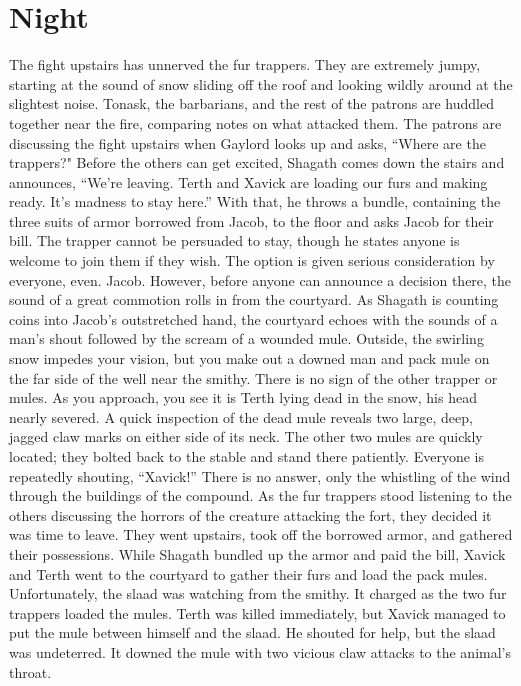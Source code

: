 \documentclass[a5paper,11pt,twoside]{book}
\begin{document}
{{{{\section*{Night} The fight upstairs has unnerved the fur trappers.
They are extremely jumpy, starting at the sound of snow sliding off the roof and looking wildly around at the slightest noise.
Tonask, the barbarians, and the rest of the patrons are huddled together near the fire, comparing notes on what attacked them.
The patrons are discussing the fight upstairs when Gaylord looks up and asks, “Where are the trappers?" Before the others can get excited, Shagath comes down the stairs and announces, “We’re leaving.
Terth and Xavick are loading our furs and making ready.
It’s madness to stay here.” With that, he throws a bundle, containing the three suits of armor borrowed from Jacob, to the floor and asks Jacob for their bill.
The trapper cannot be persuaded to stay, though he states anyone is welcome to join them if they wish.
The option is given serious consideration by everyone, even.
Jacob.
However, before anyone can announce a decision there, the sound of a great commotion rolls in from the courtyard.
 As Shagath is counting coins into Jacob’s outstretched hand, the courtyard echoes with the sounds of a man’s shout followed by the scream of a wounded mule.
Outside, the swirling snow impedes your vision, but you make out a downed man and pack mule on the far side of the well near the smithy.
There is no sign of the other trapper or mules.
As you approach, you see it is Terth lying dead in the snow, his head nearly severed.
A quick inspection of the dead mule reveals two large, deep, jagged claw marks on either side of its neck.
The other two mules are quickly located; they bolted back to the stable and stand there patiently.
Everyone is repeatedly shouting, “Xavick!” There is no answer, only the whistling of the wind through the buildings of the compound.
As the fur trappers stood listening to the others discussing the horrors of the creature attacking the fort, they decided it was time to leave.
They went upstairs, took off the borrowed armor, and gathered their possessions.
While Shagath bundled up the armor and paid the bill, Xavick and Terth went to the courtyard to gather their furs and load the pack mules.
Unfortunately, the slaad was watching from the smithy.
It charged as the two fur trappers loaded the mules.
Terth was killed immediately, but Xavick managed to put the mule between himself and the slaad.
He shouted for help, but the slaad was undeterred.
It downed the mule with two vicious claw attacks to the animal’s throat.
}}}}
\end{document}
